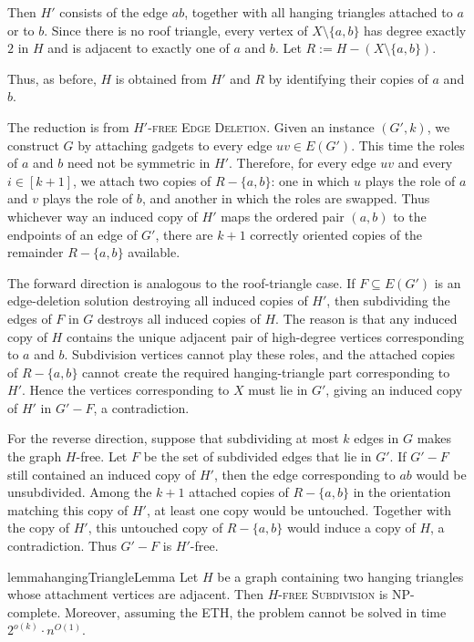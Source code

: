\documentclass[a4paper,UKenglish,cleveref, autoref, thm-restate]{lipics-v2021}
\begin{document}
Then $H'$ consists of the edge $ab$, together with all hanging triangles attached to $a$ or to $b$.
Since there is no roof triangle, every vertex of $X\setminus\{a,b\}$ has degree exactly $2$ in $H$ and is adjacent to exactly one of $a$ and $b$.
Let
$ R := H-(X\setminus\{a,b\})$.

Thus, as before, $H$ is obtained from $H'$ and $R$ by identifying their copies of $a$ and $b$.

The reduction is from \textsc{$H'$-free Edge Deletion}.
Given an instance $(G',k)$, we construct $G$ by attaching gadgets to every edge $uv\in E(G')$.
This time the roles of $a$ and $b$ need not be symmetric in $H'$.
Therefore, for every edge $uv$ and every $i\in[k+1]$, we attach two copies of $R-\{a,b\}$:
one in which $u$ plays the role of $a$ and $v$ plays the role of $b$, and another in which the roles are swapped.
Thus whichever way an induced copy of $H'$ maps the ordered pair $(a,b)$ to the endpoints of an edge of $G'$, there are $k+1$ correctly oriented copies of the remainder $R-\{a,b\}$ available.

The forward direction is analogous to the roof-triangle case.
If $F\subseteq E(G')$ is an edge-deletion solution destroying all induced copies of $H'$, then subdividing the edges of $F$ in $G$ destroys all induced copies of $H$.
The reason is that any induced copy of $H$ contains the unique adjacent pair of high-degree vertices corresponding to $a$ and $b$.
Subdivision vertices cannot play these roles, and the attached copies of $R-\{a,b\}$ cannot create the required hanging-triangle part corresponding to $H'$.
Hence the vertices corresponding to $X$ must lie in $G'$, giving an induced copy of $H'$ in $G'-F$, a contradiction.

For the reverse direction, suppose that subdividing at most $k$ edges in $G$ makes the graph $H$-free.
Let $F$ be the set of subdivided edges that lie in $G'$.
If $G'-F$ still contained an induced copy of $H'$, then the edge corresponding to $ab$ would be unsubdivided.
Among the $k+1$ attached copies of $R-\{a,b\}$ in the orientation matching this copy of $H'$, at least one copy would be untouched.
Together with the copy of $H'$, this untouched copy of $R-\{a,b\}$ would induce a copy of $H$, a contradiction.
Thus $G'-F$ is $H'$-free.

\begin{restatable}{lemma}{hangingTriangleLemma}
\label{lem:2-hanging-triangles}
Let $H$ be a graph containing two hanging triangles whose attachment vertices are adjacent.
Then \textsc{$H$-free Subdivision} is NP-complete.
Moreover, assuming the ETH, the problem cannot be solved in time
$2^{o(k)}\cdot n^{O(1)}$.
\end{restatable}
\end{document}
